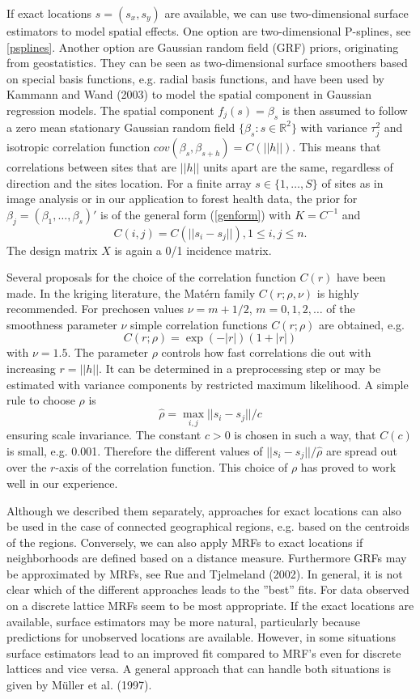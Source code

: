 If exact locations $s=(s_x,s_y)$ are available, we can use
two-dimensional surface estimators to model spatial effects. One
option are two-dimensional P-splines, see \autoref{psplines}.
Another option are Gaussian random field (GRF) priors, originating
from geostatistics. They can be seen as two-dimensional surface
smoothers based on special basis functions, e.g. radial basis
functions, and have been used by Kammann and Wand (2003) to model
the spatial component in Gaussian regression models. The spatial
component $f_{j}(s)=\beta_s$ is then assumed to follow a zero
mean stationary Gaussian random field
$\{\beta_s:s\in\mathbb{R}^2\}$ with variance $\tau_{j}^2$ and
isotropic correlation function
$cov(\beta_s,\beta_{s+h})=C(||h||)$. This means that correlations
between sites that are $||h||$ units apart are the same,
regardless of direction and the sites location. For a finite array
$s\in\{1,\ldots,S\}$ of sites as in image analysis or in our
application to forest health data, the prior for
$\beta_j=(\beta_1,\ldots,\beta_s)'$ is of the general form
(\ref{genform}) with $K=C^{-1}$ and
\[C(i,j)=C(||s_i-s_j||), 1\le i,j\le n.\]
The design matrix $X$ is again a 0/1 incidence matrix.

Several proposals for the choice of the correlation function
$C(r)$ have been made. In the kriging literature, the Mat{\'e}rn
family $C(r;\rho,\nu)$ is highly recommended. For prechosen values $\nu=m+1/2$,
$m=0,1,2,\ldots$ of the smoothness parameter $\nu$ simple
correlation functions $C(r;\rho)$ are obtained, e.g.
\[C(r;\rho)=\exp(-|r|)(1+|r|)\]
with $\nu=1.5$. The parameter $\rho$ controls how fast
correlations die out with increasing $r=||h||$. It can be
determined in a preprocessing step or may be estimated with
variance components by restricted maximum likelihood. A simple
rule to choose $\rho$ is
\[\hat{\rho}=\max_{i,j}||s_i-s_j||/c\]
ensuring scale invariance. The constant $c>0$ is chosen in such a
way, that $C(c)$ is small, e.g. 0.001. Therefore the different
values of $||s_i-s_j||/\hat{\rho}$ are spread out over the
$r$-axis of the correlation function. This choice of $\rho$ has
proved to work well in our experience.

Although we described them separately, approaches for exact
locations can also be used in the case of connected geographical
regions, e.g. based on the centroids of the regions. Conversely,
we can also apply MRFs to exact locations if neighborhoods are
defined based on a distance measure. Furthermore GRFs may be
approximated by MRFs, see Rue and Tjelmeland (2002). In general, it is
not clear which of the different approaches leads to the ''best''
fits. For data observed on a discrete lattice MRFs seem to be most
appropriate. If the exact locations are available, surface
estimators may be more natural, particularly because predictions
for unobserved locations are available. However, in some
situations surface estimators lead to an improved fit compared to
MRF's even for discrete lattices and vice versa. A general
approach that can handle both situations is given by
M\"{u}ller et al. (1997).

